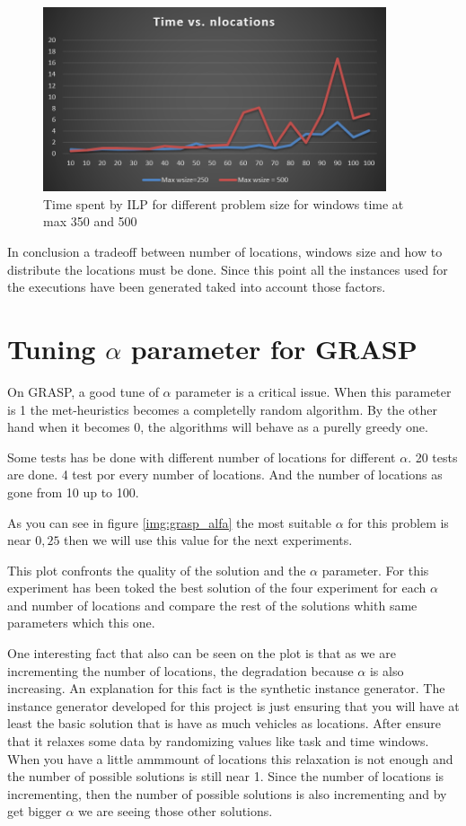 \documentclass[]{report}
\begin{document}
\begin{figure}
	\caption{Time spent by ILP for different problem size for windows time at max 350 and 500}
	\label{img:time_vs_wsize}
	\centering
	\includegraphics[width=0.9\textwidth]{./imgs/ilp_wsize_aggregated.png}
\end{figure}

In conclusion a tradeoff between number of locations, windows size and how to distribute the locations must be done. Since this point all the instances used for the executions have been generated taked into account those factors.

\section{Tuning $\alpha$ parameter for GRASP}\label{s:tuning_alpha}

On GRASP, a good tune of $\alpha$ parameter is a critical issue. When this parameter is 1 the met-heuristics becomes a completelly random algorithm. By the other hand when it becomes 0, the algorithms will behave as a purelly greedy one.

Some tests has be done with different number of locations for different $\alpha$. 20 tests are done. 4 test por every number of locations. And the number of locations as gone from 10 up to 100.

As you can see in figure \ref{img:grasp_alfa} the most suitable $\alpha$ for this problem is near $0,25$ then we will use this value for the next experiments.

This plot confronts the quality of the solution and the $\alpha$ parameter. For this experiment has been toked the best solution of the four experiment for each $\alpha$ and number of locations and compare the rest of the solutions whith same parameters which this one.

One interesting fact that also can be seen on the plot is that as we are incrementing the number of locations, the degradation because $\alpha$ is also increasing. An explanation for this fact is the synthetic instance generator. The instance generator developed for this project is just ensuring that you will have at least the basic solution that is have as much vehicles as locations. After ensure that it relaxes some data by randomizing values like task and time windows. When you have a little ammmount of locations this relaxation is not enough and the number of possible solutions is still near 1. Since the number of locations is incrementing, then the number of possible solutions is also incrementing and by get bigger $\alpha$ we are seeing those other solutions.
\end{document}
